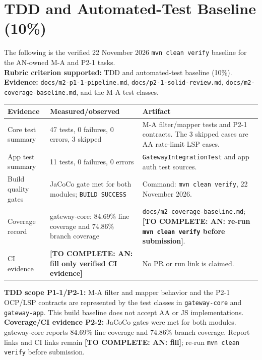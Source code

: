 \documentclass[12pt,a4paper]{article}
\newcommand{\cls}[1]{\nolinkurl{#1}}
\newcommand{\todo}[1]{\textcolor{red!70!black}{\textbf{[TO COMPLETE: #1]}}}
\begin{document}
\section{TDD and Automated-Test Baseline (10\%)}\label{sec:tdd}
The following is the verified 22 November 2026 \texttt{mvn clean verify} baseline for the AN-owned M-A and P2-1 tasks.\\
\textbf{Rubric criterion supported:} TDD and automated-test baseline (10\%). \textbf{Evidence:} \cls{docs/m2-p1-1-pipeline.md}, \cls{docs/p2-1-solid-review.md}, \cls{docs/m2-coverage-baseline.md}, and the M-A test classes.
\begin{longtable}{L{3.5cm} L{3.6cm} L{5.1cm}}\toprule
\textbf{Evidence} & \textbf{Measured/observed} & \textbf{Artifact}\\\midrule\endhead
Core test summary & 47 tests, 0 failures, 0 errors, 3 skipped & M-A filter/mapper tests and P2-1 contracts. The 3 skipped cases are AA rate-limit LSP cases.\\
App test summary & 11 tests, 0 failures, 0 errors & \cls{GatewayIntegrationTest} and app auth test sources.\\
Build quality gates & JaCoCo gate met for both modules; \texttt{BUILD SUCCESS} & Command: \texttt{mvn clean verify}, 22 November 2026.\\
Coverage record & gateway-core: 84.69\% line coverage and 74.86\% branch coverage & \cls{docs/m2-coverage-baseline.md}; \todo{AN: re-run \texttt{mvn clean verify} before submission}.\\
CI evidence & \todo{AN: fill only verified CI evidence} & No PR or run link is claimed.\\\bottomrule\end{longtable}
\textbf{TDD scope P1-1/P2-1:} M-A filter and mapper behavior and the P2-1 OCP/LSP contracts are represented by the test classes in \cls{gateway-core} and \cls{gateway-app}. This build baseline does not accept AA or JS implementations.
\textbf{Coverage/CI evidence P2-2:} JaCoCo gates were met for both modules. gateway-core reports 84.69\% line coverage and 74.86\% branch coverage. Report links and CI links remain \todo{AN: fill}; re-run \texttt{mvn clean verify} before submission.
\end{document}
